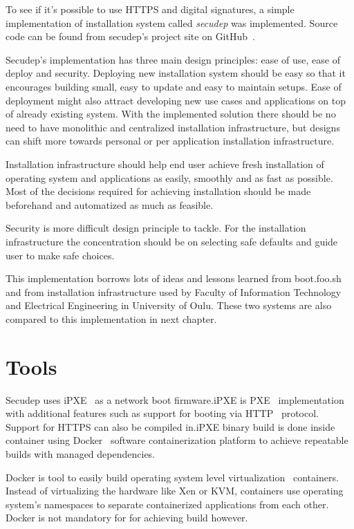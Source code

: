 
To see if it's possible to use HTTPS and digital signatures, a simple
implementation of installation system called \emph{secudep} was
implemented. Source code can be found from secudep's project site on
GitHub~\cite{secudep}.

Secudep's implementation has three main design principles: ease of
use, ease of deploy and security. Deploying new installation system
should be easy so that it encourages building small, easy to update
and easy to maintain setups. Ease of deployment might also attract
developing new use cases and applications on top of already existing
system. With the implemented solution there should be no need to have
monolithic and centralized installation infrastructure, but designs
can shift more towards personal or per application installation
infrastructure.

Installation infrastructure should help end user achieve fresh
installation of operating system and applications as easily, smoothly
and as fast as possible. Most of the decisions required for achieving
installation should be made beforehand and automatized as much as
feasible.

Security is more difficult design principle to tackle. For the
installation infrastructure the concentration should be on selecting
safe defaults and guide user to make safe choices.

This implementation borrows lots of ideas and lessons learned from
boot.foo.sh\cite{boot-foo-sh} and from installation infrastructure
used by Faculty of Information Technology and Electrical Engineering
in University of Oulu. These two systems are also compared to this
implementation in next chapter.

\section{Tools}

Secudep uses iPXE~\cite{iPXE} as a network boot firmware.\@ iPXE is
PXE~\cite{PXEspec} implementation with additional features such as
support for booting via HTTP~\cite{RFC2616} protocol. Support for
HTTPS can also be compiled in.\@ iPXE binary build is done inside
container using Docker~\cite{Docker} software containerization
platform to achieve repeatable builds with managed dependencies.

Docker is tool to easily build operating system level
virtualization~\cite{Soltesz2007} containers. Instead of virtualizing
the hardware like Xen or KVM, containers use operating system's
namespaces to separate containerized applications from each
other. Docker is not mandatory for for achieving build however.

